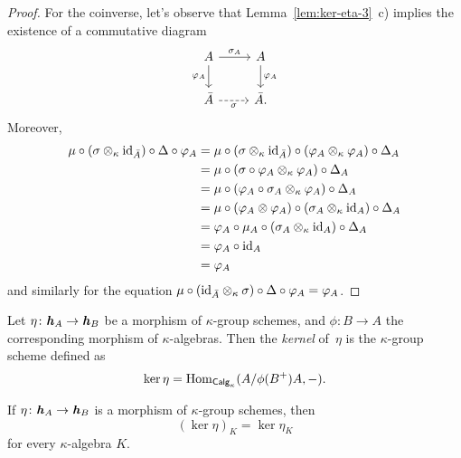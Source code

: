 \begin{proof}
    For the coinverse, let's observe that Lemma~\ref{lem:ker-eta-3}~c) implies the existence of a commutative diagram
    $$
        \begin{tikzcd}
            A
                    \arrow[r,"\sigma_A"]
                    \arrow[d,"\varphi_A"']
                &A
                    \arrow[d,"\varphi_A"]\\
            \bar A
                    \arrow[r,"\sigma"',dashed]
                &\bar A.
        \end{tikzcd}
    $$
    Moreover,
    \begin{align*}
        \mu\circ(\sigma\otimes_\kappa\text{\rm id}_{\bar A})
                \circ\Delta\circ\varphi_A
            &= \mu\circ(\sigma\otimes_\kappa\text{\rm id}_{\bar A})
                \circ(\varphi_A\otimes_\kappa\varphi_A)\circ\Delta_A\\
            &= \mu\circ(\sigma\circ\varphi_A\otimes_\kappa\varphi_A)
                \circ\Delta_A\\
            &= \mu\circ(\varphi_A\circ\sigma_A\otimes_\kappa\varphi_A)
                \circ\Delta_A\\
            &= \mu\circ(\varphi_A\otimes\varphi_A)
                \circ(\sigma_A\otimes_\kappa\text{\rm id}_A)\circ\Delta_A\\
            &= \varphi_A\circ\mu_A
                \circ(\sigma_A\otimes_\kappa\text{\rm id}_A)\circ\Delta_A\\
            &= \varphi_A\circ\text{\rm id}_A\\
            &= \varphi_A
    \end{align*}
    and similarly for the equation $\mu
        \circ(\text{\rm id}_{\bar A}\otimes_\kappa\sigma)
        \circ\Delta\circ\varphi_A=\varphi_A$.
\end{proof}

\begin{defn}\label{defn:ker-eta}
    Let $\eta\colon\textrm{\boldmath$\mathit h$}_A\to\textrm{\boldmath$\mathit h$}_B$ be a morphism of $\kappa$-group schemes, and $\phi\colon B \to A$ the corresponding morphism of $\kappa$-algebras. Then the \textsl{kernel} of~$\eta$ is the $\kappa$-group scheme defined as
    $$
        \ker\eta ={\rm Hom}_{\mathsf{Calg}_\kappa}(A / \phi(B^+)A,-).
    $$
\end{defn}

\begin{thm}\label{thm:ker-eta}
    If\/ $\eta\colon\textrm{\boldmath$\mathit h$}_A\to\textrm{\boldmath$\mathit h$}_B$ is a morphism of\/ $\kappa$-group schemes, then
    $$
        (\ker\eta)_K=\ker\eta_K
    $$
    for every\/ $\kappa$-algebra\/ $K$.
\end{thm}

